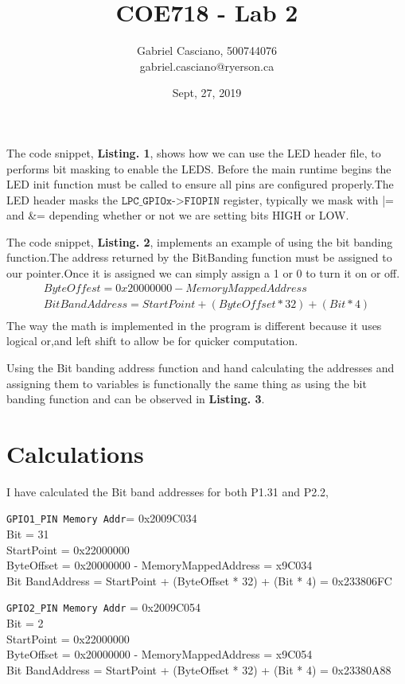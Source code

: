 \documentclass[a4paper, 12pt]{article}
\title{COE718 - Lab 2}
\date{Sept, 27, 2019}
\author{Gabriel Casciano, 500744076\\ gabriel.casciano@ryerson.ca}
\newcommand\var{\texttt}
\begin{document}
    \maketitle

    The code snippet, \textbf{Listing. 1}, shows how we can use the LED header file, to performs bit masking to enable the LEDS. Before
    the main runtime begins the LED init function must be called to ensure all pins are configured properly.The LED header masks the
    $\var{LPC_GPIOx->FIOPIN}$ register, typically we mask with |= and &= depending whether or not we are setting bits HIGH or LOW.

    The code snippet, \textbf{Listing. 2}, implements an example of using the bit banding function.The address returned by the
    BitBanding function must be assigned to our pointer.Once it is assigned we can simply assign a 1 or 0 to turn
    it on or off.
    \begin {gather*}
        ByteOffest = 0x20000000 - MemoryMappedAddress\\
        Bit BandAddress = StartPoint + (ByteOffset * 32) + (Bit * 4)\\
    \end  {gather*}
    The way the math is implemented in the program is different because it uses logical or,and left shift to allow
    be for quicker computation.

    Using the Bit banding address function and hand calculating the addresses and assigning them to variables is
    functionally the same thing as using the bit banding function and can be observed in \textbf{Listing. 3}.

    \section*{Calculations}\label{sec:calculations}
    I have calculated the Bit band addresses for both P1.31 and P2.2,
    \subitem
    \begin{eqaution}
    \var{GPIO1_PIN Memory Addr}= 0x2009C034\\
Bit = 31\\
StartPoint = 0x22000000\\
ByteOffset = 0x20000000 - MemoryMappedAddress = x9C034\\
Bit BandAddress = StartPoint + (ByteOffset * 32) + (Bit * 4) = 0x233806FC\\
    \end {eqaution}
    \subitem
    \begin{eqaution}
        \var{GPIO2_PIN Memory Addr} = 0x2009C054\\
Bit = 2\\
StartPoint = 0x22000000\\
ByteOffset = 0x20000000 - MemoryMappedAddress = x9C054\\
Bit BandAddress = StartPoint + (ByteOffset * 32) + (Bit * 4) = 0x23380A88\\
    \end {eqaution}
\end{document}
